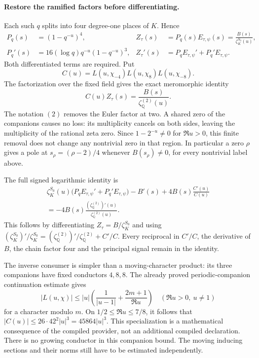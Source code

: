 \paragraph{Restore the ramified factors before differentiating.}
Each such \(q\) splits into four degree-one places of \(K\). Hence
\begin{align*}
 P_q(s)&=(1-q^{-u})^4,&
 Z_\tau(s)&=P_q(s)E_{\tau,\psi}(s)
             =\frac{B(s)}{\zeta_K^{S_0}(u)},\\
 P_q'(s)&=16(\log q)q^{-u}(1-q^{-u})^3,&
 Z_\tau'(s)&=P_qE_{\tau,\psi}'+P_q'E_{\tau,\psi}.
\end{align*}
Both differentiated terms are required. Put
\[
 C(u)=L(u,\chi_{-4})L(u,\chi_8)L(u,\chi_{-8}).
\]
The factorization over the fixed field gives the exact meromorphic
identity
\begin{equation}\label{eq:sp4-fixed-spectrum-inverse}
 C(u)Z_\tau(s)=\frac{B(s)}{\zeta_{\mathbb Q}^{(2)}(u)}.
\end{equation}
The notation \((2)\) removes the Euler factor at two. A shared zero
of the companions causes no loss: its multiplicity cancels on both
sides, leaving the multiplicity of the rational zeta zero. Since
\(1-2^{-u}\ne0\) for \(\Re u>0\), this finite removal does not
change any nontrivial zero in that region. In particular a zero
\(\rho\) gives a pole at \(s_\rho=(\rho-2)/4\) whenever
\(B(s_\rho)\ne0\), for every nontrivial label above.

The full signed logarithmic identity is
\begin{multline}\label{eq:sp4-fixed-spectrum-log}
 \zeta_K^{S_0}(u)
   \bigl(P_qE_{\tau,\psi}'+P_q'E_{\tau,\psi}\bigr)-B'(s)
    +4B(s)\frac{C'(u)}{C(u)}\\
 =-4B(s)\frac{(\zeta_{\mathbb Q}^{(2)})'(u)}
                         {\zeta_{\mathbb Q}^{(2)}(u)}.
\end{multline}
This follows by differentiating \(Z_\tau=B/\zeta_K^{S_0}\)
and using \((\zeta_K^{S_0})'/\zeta_K^{S_0}
=(\zeta_{\mathbb Q}^{(2)})'/\zeta_{\mathbb Q}^{(2)}+C'/C\).
Every reciprocal in \(C'/C\), the derivative of \(B\), the chain
factor four and the principal signal remain in the identity.

The inverse consumer is simpler than a moving-character product:
its three companions have fixed conductors \(4,8,8\).
The already proved periodic-companion continuation estimate gives
\[
 |L(u,\chi)|\le |u|
   \left(\frac1{|u-1|}+\frac{2m+1}{\Re u}\right)
 \quad(\Re u>0,\ u\ne1)
\]
for a character modulo \(m\). On
\(1/2\le\Re u\le7/8\), it follows that
\(|C(u)|\le26\cdot42^2|u|^3=45864|u|^3\).
This specialization is a mathematical consequence of the compiled
provider, not an additional compiled declaration. There is no
growing conductor in this companion bound. The moving inducing
sections and their norms still have to be estimated independently.

